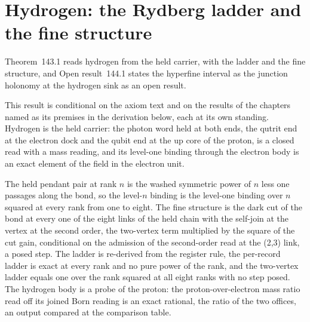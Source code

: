 \section{Hydrogen: the Rydberg ladder and the fine structure}\label{mod:V-4-hydrogen-the-rydberg-ladder-and-the-fine-structure}
\label{narr:open:5-4}Theorem~143.1 reads hydrogen from the held carrier, with the ladder and the fine structure, and Open result~144.1 states the hyperfine interval as the junction holonomy at the hydrogen sink as an open result.
\begin{chconditional}\label{box:V-4-hydrogen-the-rydberg-ladder-and-the-fine-structure:1}
This result is conditional on the axiom text and on the results of the chapters named as its premises in the derivation below, each at its own standing.
Hydrogen is the held carrier: the photon word held at both ends, the qutrit end at the electron dock and the qubit end at the up core of the proton, is a closed read with a mass reading, and its level-one binding through the electron body is an exact element of the field in the electron unit.
\end{chconditional}
The held pendant pair at rank $n$ is the washed symmetric power of $n$ less one passages along the bond, so the level-$n$ binding is the level-one binding over $n$ squared at every rank from one to eight.
The fine structure is the dark cut of the bond at every one of the eight links of the held chain with the self-join at the vertex at the second order, the two-vertex term multiplied by the square of the cut gain, conditional on the admission of the second-order read at the (2,3) link, a posed step.
The ladder is re-derived from the register rule, the per-record ladder is exact at every rank and no pure power of the rank, and the two-vertex ladder equals one over the rank squared at all eight ranks with no step posed.
The hydrogen body is a probe of the proton: the proton-over-electron mass ratio read off its joined Born reading is an exact rational, the ratio of the two offices, an output compared at the comparison table.
